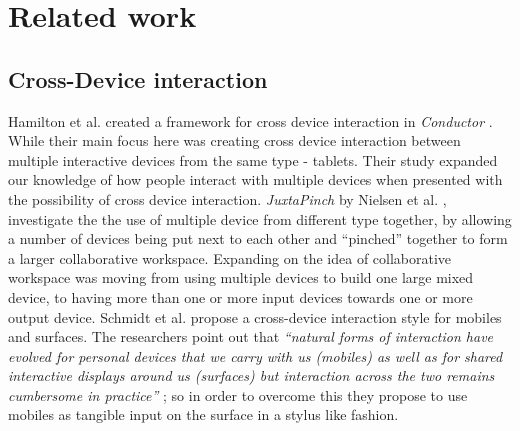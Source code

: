 \section{Related work} \label{sec:relatedwork}
\subsection{Cross-Device interaction}
\blockquote{\itshape{}\cite{literature review}}

Hamilton et al. created a framework for cross device interaction in \emph{Conductor} \cite{Hamilton:2014}.
While their main focus here was creating cross device interaction between multiple interactive devices from the same type - tablets.
Their study expanded our knowledge of how people interact with multiple devices when presented with the possibility of cross device interaction.
\emph{JuxtaPinch} by Nielsen et al. \cite{Nielsen:2014}, investigate the the use of multiple device from different type together, by allowing a number of devices being put next to each other and ``pinched'' together to form a larger collaborative workspace.
Expanding on the idea of collaborative workspace was moving from using multiple devices to build one large mixed device, to having more than one or more input devices towards one or more output device.
Schmidt et al. propose a cross-device interaction style for mobiles and surfaces.
The researchers point out that \emph{``natural forms of interaction have evolved for personal devices that we carry with us (mobiles) as well as for shared interactive displays around us (surfaces) but interaction across the two remains cumbersome in practice''} \cite{Schmidt:2012}; so in order to overcome this they propose to use mobiles as tangible input on the surface in a stylus like fashion.

